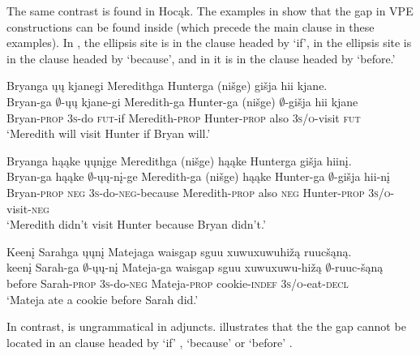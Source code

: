 \documentclass[output=paper]{LSP/langsci}
\begin{document}
 
The same contrast is found in Hocąk. The examples in  show that the gap in VPE constructions can be found inside   (which precede the main clause in these examples). In , the ellipsis site is in the clause headed by `if', in  the ellipsis site is in the clause headed by `because', and in  it is in the clause headed by `before.'
 
 
\ea\label{ex:johnson:35}
\ea\label{ex:johnson:35a} 
\glll Bryanga ųų kjanegi Meredithga Hunterga (nišge) {gišja hii} kjane.\\
Bryan-ga {\db}$\emptyset$-ųų kjane-gi Meredith-ga Hunter-ga (nišge) $\emptyset$-{gišja hii} kjane\\
Bryan-\textsc{prop} \textsc{3s}-do \textsc{fut}-if Meredith-\textsc{prop} Hunter-\textsc{prop} also \textsc{3s/o}-visit \textsc{fut}\\
\trans `Meredith will visit Hunter if Bryan will.'
 
\ex\label{ex:johnson:35b} 
\glll Bryanga hąąke ųųnįge Meredithga (nišge) hąąke Hunterga {gišja hiinį}.\\
Bryan-ga hąąke {\db}$\emptyset$-ųų-nį-ge Meredith-ga (nišge) hąąke Hunter-ga $\emptyset$-{gišja hii-nį}\\
Bryan-\textsc{prop} \textsc{neg} \textsc{3s}-do-\textsc{neg}-because Meredith-\textsc{prop} also \textsc{neg} Hunter-\textsc{prop} \textsc{3s/o}-visit-\textsc{neg}\\
\trans `Meredith didn't visit Hunter because Bryan didn't.'
 
\ex\label{ex:johnson:35c} 
\glll Keenį Sarahga ųųnį Matejaga {waisgap sguu xuwuxuwuhižą} ruucšąną.\\
keenį Sarah-ga {\db}$\emptyset$-ųų-nį Mateja-ga {waisgap sguu xuwuxuwu-hižą} $\emptyset$-ruuc-šąną\\
before Sarah-\textsc{prop} \textsc{3s}-do-\textsc{neg} Mateja-\textsc{prop} cookie-\textsc{indef} \textsc{3s/o}-eat-\textsc{decl}\\
\trans `Mateja ate a cookie before Sarah did.'
\z
\z

In contrast,  is ungrammatical in adjuncts.  illustrates that the the gap cannot be located in an  clause headed by `if' , `because'  or `before' .
\end{document}
